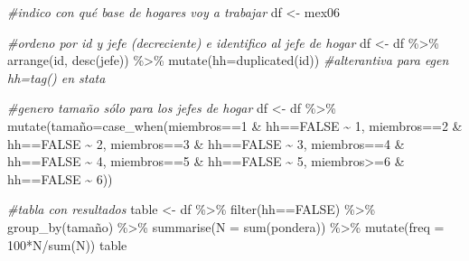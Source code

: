 \documentclass[
]{book}
\newenvironment{Shaded}{\begin{snugshade}}{\end{snugshade}}
\newcommand{\AttributeTok}[1]{\textcolor[rgb]{0.77,0.63,0.00}{#1}}
\newcommand{\CommentTok}[1]{\textcolor[rgb]{0.56,0.35,0.01}{\textit{#1}}}
\newcommand{\ConstantTok}[1]{\textcolor[rgb]{0.00,0.00,0.00}{#1}}
\newcommand{\DecValTok}[1]{\textcolor[rgb]{0.00,0.00,0.81}{#1}}
\newcommand{\FunctionTok}[1]{\textcolor[rgb]{0.00,0.00,0.00}{#1}}
\newcommand{\NormalTok}[1]{#1}
\newcommand{\OtherTok}[1]{\textcolor[rgb]{0.56,0.35,0.01}{#1}}
\newcommand{\SpecialCharTok}[1]{\textcolor[rgb]{0.00,0.00,0.00}{#1}}
\begin{document}
\begin{Shaded}
\begin{Highlighting}[]
\CommentTok{\#indico con qué base de hogares voy a trabajar}
\NormalTok{df }\OtherTok{\textless{}{-}}\NormalTok{ mex06 }

\CommentTok{\#ordeno por id y jefe (decreciente) e identifico al jefe de hogar}
\NormalTok{df }\OtherTok{\textless{}{-}}\NormalTok{ df }\SpecialCharTok{\%\textgreater{}\%} \FunctionTok{arrange}\NormalTok{(id, }\FunctionTok{desc}\NormalTok{(jefe)) }\SpecialCharTok{\%\textgreater{}\%}
          \FunctionTok{mutate}\NormalTok{(}\AttributeTok{hh=}\FunctionTok{duplicated}\NormalTok{(id))      }\CommentTok{\#alterantiva para egen hh=tag() en stata}

\CommentTok{\#genero tamaño sólo para los jefes de hogar}
\NormalTok{df }\OtherTok{\textless{}{-}}\NormalTok{ df }\SpecialCharTok{\%\textgreater{}\%} \FunctionTok{mutate}\NormalTok{(tamaño}\OtherTok{=}\FunctionTok{case\_when}\NormalTok{(miembros}\SpecialCharTok{==}\DecValTok{1} \SpecialCharTok{\&}\NormalTok{ hh}\SpecialCharTok{==}\ConstantTok{FALSE} \SpecialCharTok{\textasciitilde{}} \DecValTok{1}\NormalTok{,}
\NormalTok{                                     miembros}\SpecialCharTok{==}\DecValTok{2} \SpecialCharTok{\&}\NormalTok{ hh}\SpecialCharTok{==}\ConstantTok{FALSE} \SpecialCharTok{\textasciitilde{}} \DecValTok{2}\NormalTok{,}
\NormalTok{                                     miembros}\SpecialCharTok{==}\DecValTok{3} \SpecialCharTok{\&}\NormalTok{ hh}\SpecialCharTok{==}\ConstantTok{FALSE} \SpecialCharTok{\textasciitilde{}} \DecValTok{3}\NormalTok{,}
\NormalTok{                                     miembros}\SpecialCharTok{==}\DecValTok{4} \SpecialCharTok{\&}\NormalTok{ hh}\SpecialCharTok{==}\ConstantTok{FALSE} \SpecialCharTok{\textasciitilde{}} \DecValTok{4}\NormalTok{,}
\NormalTok{                                     miembros}\SpecialCharTok{==}\DecValTok{5} \SpecialCharTok{\&}\NormalTok{ hh}\SpecialCharTok{==}\ConstantTok{FALSE} \SpecialCharTok{\textasciitilde{}} \DecValTok{5}\NormalTok{,}
\NormalTok{                                     miembros}\SpecialCharTok{\textgreater{}=}\DecValTok{6} \SpecialCharTok{\&}\NormalTok{ hh}\SpecialCharTok{==}\ConstantTok{FALSE} \SpecialCharTok{\textasciitilde{}} \DecValTok{6}\NormalTok{))}

\CommentTok{\#tabla con resultados}
\NormalTok{table }\OtherTok{\textless{}{-}}\NormalTok{ df }\SpecialCharTok{\%\textgreater{}\%} \FunctionTok{filter}\NormalTok{(hh}\SpecialCharTok{==}\ConstantTok{FALSE}\NormalTok{) }\SpecialCharTok{\%\textgreater{}\%} \FunctionTok{group\_by}\NormalTok{(tamaño) }\SpecialCharTok{\%\textgreater{}\%} \FunctionTok{summarise}\NormalTok{(}\AttributeTok{N =} \FunctionTok{sum}\NormalTok{(pondera)) }\SpecialCharTok{\%\textgreater{}\%} 
                                                           \FunctionTok{mutate}\NormalTok{(}\AttributeTok{freq =} \DecValTok{100}\SpecialCharTok{*}\NormalTok{N}\SpecialCharTok{/}\FunctionTok{sum}\NormalTok{(N))}
\NormalTok{table}
\end{Highlighting}
\end{Shaded}
\end{document}
